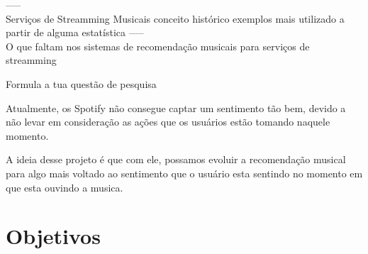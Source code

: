 \documentclass{article}
\begin{document}





----- \\

Serviços de Streamming Musicais
  conceito
  histórico
  exemplos
  mais utilizado a partir de alguma estatística
----- \\









O que faltam nos sistemas de recomendação musicais para serviços de streamming



Formula a tua questão de pesquisa


Atualmente, os Spotify não consegue captar um sentimento tão bem, devido a não levar em consideração as ações que os usuários estão tomando naquele momento. 

A ideia desse projeto é que com ele, possamos evoluir a recomendação musical para algo mais voltado ao sentimento que o usuário esta sentindo no momento em que esta ouvindo a musica.

\newpage

\section{Objetivos}
\end{document}
